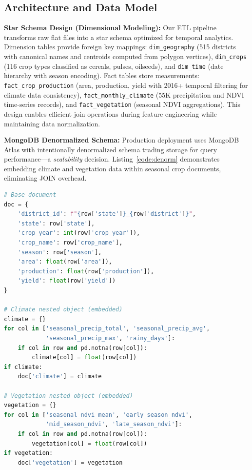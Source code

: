\documentclass[10pt,a4paper]{article}
\begin{document}
\subsection{Architecture and Data Model}

\textbf{Star Schema Design (Dimensional Modeling):}
Our ETL pipeline transforms raw flat files into a star schema optimized for temporal analytics. Dimension tables provide foreign key mappings: \texttt{dim\_geography} (515 districts with canonical names and centroids computed from polygon vertices), \texttt{dim\_crops} (116 crop types classified as cereals, pulses, oilseeds), and \texttt{dim\_time} (date hierarchy with season encoding). Fact tables store measurements: \texttt{fact\_crop\_production} (area, production, yield with 2016+ temporal filtering for climate data consistency), \texttt{fact\_monthly\_climate} (55K precipitation and NDVI time-series records), and \texttt{fact\_vegetation} (seasonal NDVI aggregations). This design enables efficient join operations during feature engineering while maintaining data normalization.

\textbf{MongoDB Denormalized Schema:}
Production deployment uses MongoDB Atlas with intentionally denormalized schema trading storage for query performance—a \textit{scalability} decision. Listing~\ref{code:denorm} demonstrates embedding climate and vegetation data within seasonal crop documents, eliminating JOIN overhead.

\begin{lstlisting}[caption={Denormalized MongoDB schema from migrate\_to\_mongodb.py (lines 134-161)},label=code:denorm,language=Python]
# Base document
doc = {
    'district_id': f"{row['state']}_{row['district']}",
    'state': row['state'],
    'crop_year': int(row['crop_year']),
    'crop_name': row['crop_name'],
    'season': row['season'],
    'area': float(row['area']),
    'production': float(row['production']),
    'yield': float(row['yield'])
}

# Climate nested object (embedded)
climate = {}
for col in ['seasonal_precip_total', 'seasonal_precip_avg',
            'seasonal_precip_max', 'rainy_days']:
    if col in row and pd.notna(row[col]):
        climate[col] = float(row[col])
if climate:
    doc['climate'] = climate

# Vegetation nested object (embedded)
vegetation = {}
for col in ['seasonal_ndvi_mean', 'early_season_ndvi',
            'mid_season_ndvi', 'late_season_ndvi']:
    if col in row and pd.notna(row[col]):
        vegetation[col] = float(row[col])
if vegetation:
    doc['vegetation'] = vegetation
\end{lstlisting}
\end{document}
